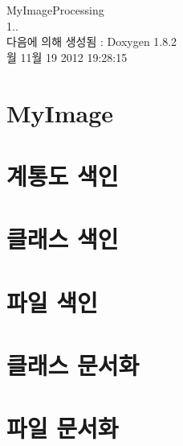 \documentclass{book}
\begin{document}
\hypersetup{pageanchor=false,citecolor=blue}
\begin{titlepage}
\vspace*{7cm}
\begin{center}
{\Large My\-Image\-Processing \\[1ex]\large 1.. }\\
\vspace*{1cm}
{\large 다음에 의해 생성됨 \-:  Doxygen 1.8.2}\\
\vspace*{0.5cm}
{\small 월 11월 19 2012 19:28:15}\\
\end{center}
\end{titlepage}
\clearemptydoublepage
{}
\tableofcontents
\clearemptydoublepage
{}
\hypersetup{pageanchor=true,citecolor=blue}
\chapter{My\-Image}
\label{index}\hypertarget{index}{}
\chapter{계통도 색인}

\chapter{클래스 색인}

\chapter{파일 색인}

\chapter{클래스 문서화}















\chapter{파일 문서화}






























\printindex
\end{document}
